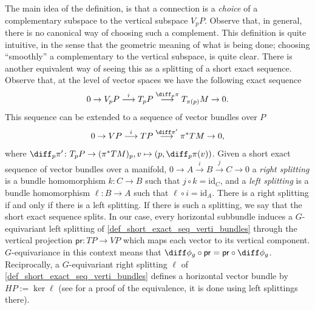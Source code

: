 The main idea of the definition, is that a connection is a \textit{choice} of a complementary subspace to the vertical subspace \(V_pP\). Observe that, in general, there is no canonical way of choosing such a complement. This definition is quite intuitive, in the sense that the geometric meaning of what is being done; choosing ``smoothly'' a complementary to the vertical subspace, is quite clear. There is another equivalent way of seeing this as a splitting of a short exact sequence. Observe that, at the level of vector spaces we have the following exact sequence 
\[
0 \to V_pP \overset{i}{\longrightarrow} T_pP \overset{\diff_p\pi}{\longrightarrow}  T_{\pi(p)}M \to 0.
\]
This sequence can be extended to a sequence of vector bundles over \(P\)
\begin{equation} \label{def_short_exact_seq_verti_bundles}
0 \to VP \overset{i}{\longrightarrow} TP \overset{\diff\pi'}{\longrightarrow} \pi^* TM \to 0,
\end{equation}
where \(\diff_p\pi'\colon T_pP \to (\pi^*TM)_p, v \mapsto (p, \diff_p\pi(v))\). Given a short exact sequence of vector bundles over a manifold, \(0 \to A \xrightarrow{i} B \xrightarrow{j} C \to 0\) a  \textit{right splitting} is a bundle homomorphism \(k\colon C\to B\) such that \(j \circ k =\mathrm{id}_C\), and a \textit{left splitting} is a bundle homomorphism \(\ell \colon B \to A\) such that \(\ell \circ i=\mathrm{id}_A\). There is a right splitting if and only if there is a left splitting. If there is such a splitting, we say that the short exact sequence splits. In our case, every horizontal subbundle induces a \(G\)-equivariant left splitting of \eqref{def_short_exact_seq_verti_bundles} through the vertical projection \(\mathsf{pr}\colon TP \to VP\) which maps each vector to its vertical component. \(G\)-equivariance in this context means that \(\diff\phi_g \circ \mathsf{pr}=\mathsf{pr}\circ \diff\phi_g\). Reciprocally, a \(G\)-equivariant right splitting \(\ell\) of \eqref{def_short_exact_seq_verti_bundles} defines a horizontal vector bundle by \(HP:=\ker \ell\) (see \parencite[Prop. 27.20]{tu2017differential} for a proof of the equivalence, it is done using left splittings there). \\



